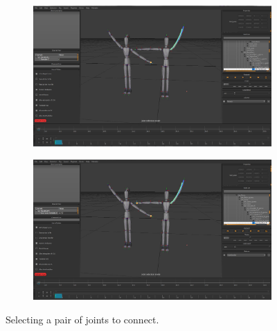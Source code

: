 \begin{figure}[h!]
	\centering
        \begin{subfigure}[b!]{0.45\textwidth}
        	\centering
                \includegraphics[width=\linewidth]{img/ui5}
        \end{subfigure}
        \quad
        \begin{subfigure}[b!]{0.45\textwidth}
        	\centering
                \includegraphics[width=\linewidth]{img/ui6}
        \end{subfigure}%
        \caption{Selecting a pair of joints to connect.}
	\label{fig:correspondence}
\end{figure}
